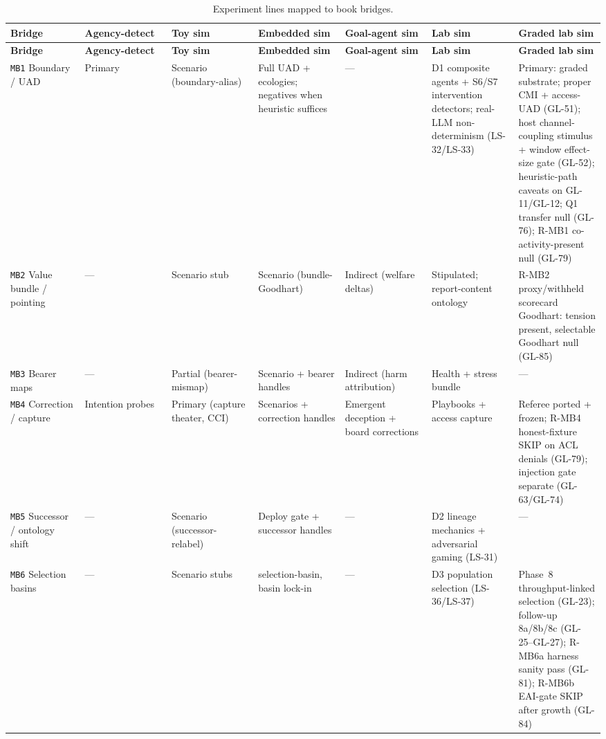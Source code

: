 \begin{landscape}
\footnotesize
\setlength{\tabcolsep}{6pt}
\setlength{\LTleft}{0pt}
\setlength{\LTright}{0pt}
\renewcommand{\arraystretch}{1.18}

\begin{longtable}{@{}L{0.12\linewidth}L{0.1467\linewidth}L{0.1467\linewidth}L{0.1467\linewidth}L{0.1467\linewidth}L{0.1467\linewidth}L{0.1467\linewidth}@{}}
\caption{Experiment lines mapped to book bridges.}\label{tab:appn-bridge-mb}\\
\toprule
\textbf{Bridge} & \textbf{Agency-detect} & \textbf{Toy sim} & \textbf{Embedded sim} & \textbf{Goal-agent sim} & \textbf{Lab sim} & \textbf{Graded lab sim} \\
\midrule
\endfirsthead
\toprule
\textbf{Bridge} & \textbf{Agency-detect} & \textbf{Toy sim} & \textbf{Embedded sim} & \textbf{Goal-agent sim} & \textbf{Lab sim} & \textbf{Graded lab sim} \\
\midrule
\endhead
\bottomrule
\endfoot
\texttt{MB1} Boundary / UAD & Primary & Scenario (boundary-alias) & Full UAD + ecologies; negatives when heuristic suffices & --- & D1 composite agents + S6/S7 intervention detectors; real-LLM non-determinism (LS-32/LS-33) & Primary: graded substrate; proper CMI + access-UAD (GL-51); host channel-coupling stimulus + window effect-size gate (GL-52); heuristic-path caveats on GL-11/GL-12; Q1 transfer null (GL-76); R-MB1 co-activity-present null (GL-79) \\
\texttt{MB2} Value bundle / pointing & --- & Scenario stub & Scenario (bundle-Goodhart) & Indirect (welfare deltas) & Stipulated; report-content ontology & R-MB2 proxy/withheld scorecard Goodhart: tension present, selectable Goodhart null (GL-85) \\
\texttt{MB3} Bearer maps & --- & Partial (bearer-mismap) & Scenario + bearer handles & Indirect (harm attribution) & Health + stress bundle & --- \\
\texttt{MB4} Correction / capture & Intention probes & Primary (capture theater, CCI) & Scenarios + correction handles & Emergent deception + board corrections & Playbooks + access capture & Referee ported + frozen; R-MB4 honest-fixture SKIP on ACL denials (GL-79); injection gate separate (GL-63/GL-74) \\
\texttt{MB5} Successor / ontology shift & --- & Scenario (successor-relabel) & Deploy gate + successor handles & --- & D2 lineage mechanics + adversarial gaming (LS-31) & --- \\
\texttt{MB6} Selection basins & --- & Scenario stubs & selection-basin, basin lock-in & --- & D3 population selection (LS-36/LS-37) & Phase~8 throughput-linked selection (GL-23); follow-up 8a/8b/8c (GL-25--GL-27); R-MB6a harness sanity pass (GL-81); R-MB6b EAI-gate SKIP after growth (GL-84) \\

\end{longtable}
\end{landscape}
